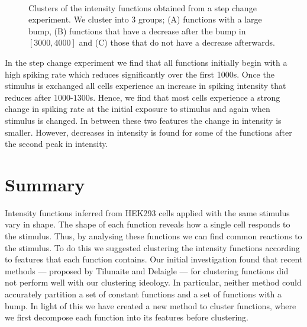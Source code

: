 \documentclass[../main.tex]{subfiles}
\begin{document}
\begin{figure}[t!]
   \hrulefill
   \begin{center} 
     \quad
      \\ 
      
    \end{center}     
    \caption{Clusters of the intensity functions obtained from a step change experiment. We cluster into 3 groups; (A) functions with a large bump, (B) functions that have a decrease after the bump in $[3000,4000]$ and (C) those that do not have a decrease afterwards.}
    \label{fig:Martin4_Clus}
    \hrulefill
    \end{figure}
    
    
     
In the step change experiment we find that all functions initially begin with a high spiking rate which reduces significantly over the first 1000s. Once the stimulus is exchanged all cells experience an increase in spiking intensity that reduces after $1000$-$1300$s.  Hence, we find that most cells experience a strong change in spiking rate at the initial exposure to stimulus and again when stimulus is changed. In between these two features the change in intensity is smaller. However, decreases in intensity is found for some of the functions after the second peak in intensity.


\section{Summary}

Intensity functions inferred from HEK293 cells applied with the same stimulus vary in shape. The shape of each function reveals how a single cell responds to the stimulus. Thus, by analysing these functions we can find common reactions to the stimulus. To do this we suggested clustering the intensity functions according to features that each function contains. Our initial investigation found that recent methods --- proposed by Tilunaite and Delaigle --- for clustering functions did not perform well with our clustering ideology. In particular, neither method could accurately partition a set of constant functions and a set of functions with a bump. In light of this we have created a new method to cluster functions, where we first decompose each function into its features before clustering. 
\end{document}
